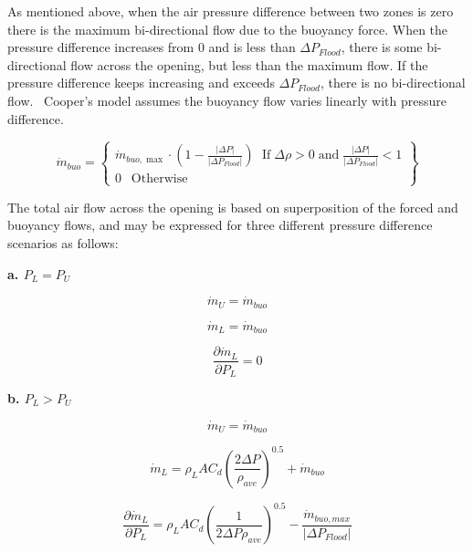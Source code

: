 As mentioned above, when the air pressure difference between two zones is zero there is the maximum bi-directional flow due to the buoyancy force. When the pressure difference increases from 0 and is less than \textbar{}$\Delta P_{Flood}$\textbar{}, there is some bi-directional flow across the opening, but less than the maximum flow. If the pressure difference keeps increasing and exceeds \textbar{}$\Delta P_{Flood}$\textbar{}, there is no bi-directional flow.~ Cooper's model assumes the buoyancy flow varies linearly with pressure difference.

\begin{equation}
\dot{m}_{buo} = \left\{ \begin{array}{l}{\dot{m}_{buo,\max }}\cdot\left( {1 - \frac{{\left| {\Delta P} \right|}}{{\left| {\Delta {P_{Flood}}} \right|}}} \right)\;\,\,\mbox{If}\;\Delta \rho  > 0\;\mbox{and}\;\frac{{\left| {\Delta P} \right|}}{{\left| {\Delta {P_{Flood}}} \right|}} < 1\\0\;\,\,\,\mbox{Otherwise}\end{array} \right\}
\end{equation}

The total air flow across the opening is based on superposition of the forced and buoyancy flows, and may be expressed for three different pressure difference scenarios as follows:

\textbf{a. $P_L = P_U$}

\begin{equation}
\dot{m}_U = \dot{m}_{buo}
\end{equation}

\begin{equation}
\dot{m}_L = \dot{m}_{buo}
\end{equation}

\begin{equation}
\frac{\partial \dot{m}_L}{\partial P_L} = 0
\end{equation}

\textbf{b. $P_L > P_U$}

\begin{equation}
\dot{m}_U = \dot{m}_{buo}
\end{equation}

\begin{equation}
\dot{m}_L = \rho_L A C_d \left( \frac{2 \Delta P}{\rho_{ave}} \right)^{0.5} + \dot{m}_{buo}
\end{equation}

\begin{equation}
\frac{\partial \dot{m}_L}{\partial P_L} = \rho_L A C_d \left( \frac{1}{2\Delta P \rho_{ave}} \right )^{0.5} - \frac{\dot{m}_{buo,max}}{|\Delta P_{Flood}|}
\end{equation}

